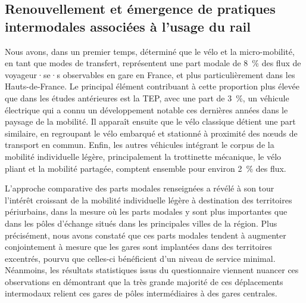 \begin{refsegment}
\subsection*{Renouvellement et émergence de pratiques intermodales associées à l'usage du rail
    \label{chap4:principaux-enseignements-1}
    }

Nous avons, dans un premier temps, déterminé que le vélo et la micro-mobilité, en tant que modes de transfert, représentent une part modale de 8~\% des flux de voyageur·se·s observables en gare en France, et plus particulièrement dans les Hauts-de-France. Le principal élément contribuant à cette proportion plus élevée que dans les études antérieures est la \acrshort{TEP}, avec une part de 3~\%, un véhicule électrique qui a connu un développement notable ces dernières années dans le paysage de la mobilité. Il apparaît ensuite que le vélo classique détient une part similaire, en regroupant le vélo embarqué et stationné à proximité des nœuds de transport en commun. Enfin, les autres véhicules intégrant le corpus de la mobilité individuelle légère, principalement la trottinette mécanique, le vélo pliant et la mobilité partagée, comptent ensemble pour environ 2~\% des flux.%

L'approche comparative des parts modales renseignées a révélé à son tour l'intérêt croissant de la mobilité individuelle légère à destination des territoires périurbains, dans la mesure où les parts modales y sont plus importantes que dans les pôles d'échange situés dans les principales villes de la région. Plus précisément, nous avons constaté que ces parts modales tendent à augmenter conjointement à mesure que les gares sont implantées dans des territoires excentrés, pourvu que celles-ci bénéficient d'un niveau de service minimal. Néanmoins, les résultats statistiques issus du questionnaire viennent nuancer ces observations en démontrant que la très grande majorité de ces déplacements intermodaux relient ces gares de pôles intermédiaires à des gares centrales.%


\end{refsegment}
